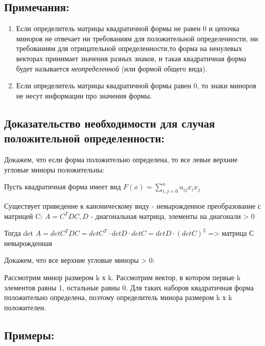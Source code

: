 \documentclass[12pt]{article}
\begin{document}
\subsection{Примечания:}

\begin{enumerate}
    \item Если определитель матрицы квадратичной формы не равен 0 и цепочка миноров не отвечает ни требованиям для положительной определенности, ни требованиям для отрицательной определенности,то форма на ненулевых векторах принимает значения разных знаков, и такая квадратичная форма будет называется  \textit{неопределенной} (или формой общего вида).
    \item Если определитель матрицы квадратичной формы равен 0, то знаки миноров не несут информации про значения формы.
\end{enumerate}

\subsection{Доказательство необходимости для случая положительной определенности:}

Докажем, что если форма положительно определена, то все левые верхние угловые миноры положительны:

Пусть квадратичная форма имеет вид $F(x) = \sum\limits_{i,j=0}^n a_{ij} x_{i} x_{j}$

Существует приведение к каноническому виду - невырожденное преобразование с матрицей C:
$A = C^{T}DC, D$ - диагональная матрица, элементы на диагонали > 0

Тогда det $A = det C^{T}DC = det C^{T} \cdot det D \cdot det C = det D \cdot (detC)^{2}$ => матрица С невырожденная

Докажем, что все верхние угловые миноры > 0:

Рассмотрим минор размером k х k. Рассмотрим вектор, в котором первые k элементов равны 1, остальные равны 0. Для таких наборов квадратичная форма положительно определена, поэтому определитель минора размером k х k положителен.

\subsection{Примеры:}
\end{document}

